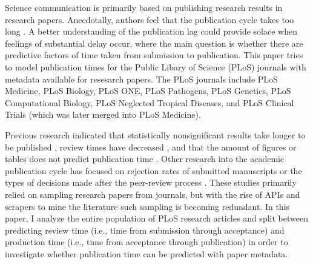 Science communication is primarily based on publishing research results in research papers. Anecdotally, authors feel that the publication cycle takes too long \cite{Himmelstein2015-me}. A better understanding of the publication lag could provide solace when feelings of substantial delay occur, where the main question is whether there are predictive factors of time taken from submission to publication. This paper tries to model publication times for the Public Libary of Science (PLoS) journals with metadata available for resesarch papers. The PLoS journals include PLoS Medicine, PLoS Biology, PLoS ONE, PLoS Pathogens, PLoS Genetics, PLoS Computational Biology, PLoS Neglected Tropical Diseases, and PLoS Clinical Trials (which was later merged into PLoS Medicine).

Previous research indicated that statistically nonsignificant results take longer to be published \cite{ioannidis1998}, review times have decreased \cite{lyman2013}, and that the amount of figures or tables does not predict publication time \cite{lee2013}. Other research into the academic publication cycle has focused on rejection rates of submitted manuscripts or the types of decisions made after the peer-review process \cite{Rosenkrantz2015-uj}. These studies primarily relied on sampling research papers from journals, but with the rise of APIs and scrapers to mine the literature \cite{Smith-Unna2014-cd} such sampling is becoming redundant. In this paper, I analyze the entire population of PLoS research articles and split between predicting review time (i.e., time from submission through acceptance) and production time (i.e., time from acceptance through publication) in order to investigate whether publication time can be predicted with paper metadata. 
  
  
  
  
  